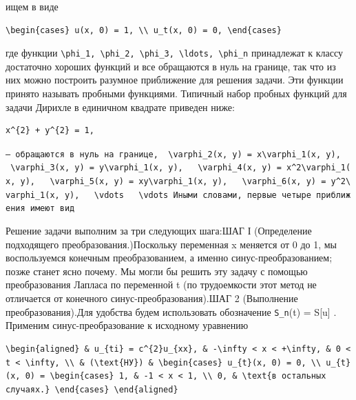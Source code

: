 \documentclass[
  ukrainian,
]{article}
\begin{document}
ищем в виде

\begin{verbatim}
\begin{cases} u(x, 0) = 1, \\ u_t(x, 0) = 0, \end{cases}
\end{verbatim}

где функции
\texttt{\textbackslash{}phi\_1,\ \textbackslash{}phi\_2,\ \textbackslash{}phi\_3,\ \textbackslash{}ldots,\ \textbackslash{}phi\_n}
принадлежат к классу достаточно хороших функций и все обращаются в нуль
на границе, так что из них можно построить разумное приближение для
решения задачи. Эти функции принято называть пробными функциями.
Типичный набор пробных функций для задачи Дирихле в единичном квадрате
приведен ниже:

\begin{verbatim}
x^{2} + y^{2} = 1,
\end{verbatim}

\texttt{—\ обращаются\ в\ нуль\ на\ границе,\ \ \textquotesingle{}\textbackslash{}varphi\_2(x,\ y)\ =\ x\textbackslash{}varphi\_1(x,\ y),\textquotesingle{}\ \ \ \textquotesingle{}\textbackslash{}varphi\_3(x,\ y)\ =\ y\textbackslash{}varphi\_1(x,\ y),\textquotesingle{}\ \ \ \textquotesingle{}\textbackslash{}varphi\_4(x,\ y)\ =\ x\^{}2\textbackslash{}varphi\_1(x,\ y),\textquotesingle{}\ \ \ \textquotesingle{}\textbackslash{}varphi\_5(x,\ y)\ =\ xy\textbackslash{}varphi\_1(x,\ y),\textquotesingle{}\ \ \ \textquotesingle{}\textbackslash{}varphi\_6(x,\ y)\ =\ y\^{}2\textbackslash{}varphi\_1(x,\ y),\textquotesingle{}\ \ \ \textquotesingle{}\textbackslash{}vdots\textquotesingle{}\ \ \ \textquotesingle{}\textbackslash{}vdots\textquotesingle{}\ Иными\ словами,\ первые\ четыре\ приближения\ имеют\ вид}

Решение задачи выполним за три следующих шага:ШАГ І (Определение
подходящего преобразования.)Поскольку переменная x меняется от 0 до 1,
мы воспользуемся конечным преобразованием, а именно
синус-преобразованием; позже станет ясно почему. Мы могли бы решить эту
задачу с помощью преобразования Лапласа по переменной t (по трудоемкости
этот метод не отличается от конечного синус-преобразования).ШАГ 2
(Выполнение преобразования).Для удобства будем использовать обозначение
\texttt{S\_n}(t) = S{[}u{]} . Применим синус-преобразование к исходному
уравнению

\begin{verbatim}
\begin{aligned} & u_{ti} = c^{2}u_{xx}, & -\infty < x < +\infty, & 0 < t < \infty, \\ & (\text{НУ}) & \begin{cases} u_{t}(x, 0) = 0, \\ u_{t}(x, 0) = \begin{cases} 1, & -1 < x < 1, \\ 0, & \text{в остальных случаях.} \end{cases} \end{aligned}
\end{verbatim}
\end{document}
